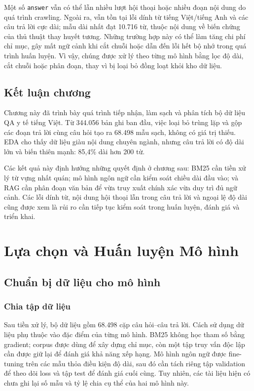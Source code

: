 \documentclass[12pt,a4paper,oneside]{report}
\begin{document}
Một số \texttt{answer} vẫn có thể lẫn nhiều lượt hội thoại hoặc nhiều đoạn nội dung do quá trình crawling. Ngoài ra, vẫn tồn tại lỗi dính từ tiếng Việt/tiếng Anh và các câu trả lời cực dài; mẫu dài nhất đạt 10.716 từ, thuộc nội dung về biến chứng của thủ thuật thay huyết tương. Những trường hợp này có thể làm tăng chi phí chỉ mục, gây mất ngữ cảnh khi cắt chuỗi hoặc dẫn đến lỗi hết bộ nhớ trong quá trình huấn luyện. Vì vậy, chúng được xử lý theo từng mô hình bằng lọc độ dài, cắt chuỗi hoặc phân đoạn, thay vì bị loại bỏ đồng loạt khỏi kho dữ liệu.

\section{Kết luận chương}
Chương này đã trình bày quá trình tiếp nhận, làm sạch và phân tích bộ dữ liệu QA y tế tiếng Việt. Từ 344.056 bản ghi ban đầu, việc loại bỏ trùng lặp và gộp các đoạn trả lời cùng câu hỏi tạo ra 68.498 mẫu sạch, không có giá trị thiếu. EDA cho thấy dữ liệu giàu nội dung chuyên ngành, nhưng câu trả lời có độ dài lớn và biến thiên mạnh: 85,4\% dài hơn 200 từ.

Các kết quả này định hướng những quyết định ở chương sau: BM25 cần tiền xử lý từ vựng nhất quán; mô hình ngôn ngữ cần kiểm soát chiều dài đầu vào; và RAG cần phân đoạn văn bản để vừa truy xuất chính xác vừa duy trì đủ ngữ cảnh. Các lỗi dính từ, nội dung hội thoại lẫn trong câu trả lời và ngoại lệ độ dài cũng được xem là rủi ro cần tiếp tục kiểm soát trong huấn luyện, đánh giá và triển khai.

\chapter{Lựa chọn và Huấn luyện Mô hình}
\label{chap:model}

\section{Chuẩn bị dữ liệu cho mô hình}
\subsection{Chia tập dữ liệu}
Sau tiền xử lý, bộ dữ liệu gồm 68.498 cặp câu hỏi--câu trả lời. Cách sử dụng dữ liệu phụ thuộc vào đặc điểm của từng mô hình. BM25 không học tham số bằng gradient; corpus được dùng để xây dựng chỉ mục, còn một tập truy vấn độc lập cần được giữ lại để đánh giá khả năng xếp hạng. Mô hình ngôn ngữ được fine-tuning trên các mẫu thỏa điều kiện độ dài, sau đó cần tách riêng tập validation để theo dõi loss và tập test để đánh giá cuối cùng. Tuy nhiên, các tài liệu hiện có chưa ghi lại số mẫu và tỷ lệ chia cụ thể của hai mô hình này.
\end{document}
